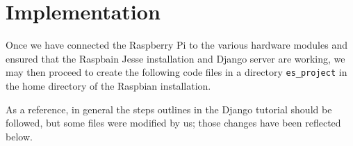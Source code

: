 \section{Implementation}

	Once we have connected the Raspberry Pi to the various hardware modules and ensured that the Raspbain Jesse installation and Django server are working, we may then proceed to create the following code files in a directory \texttt{es\_project} in the home directory of the Raspbian installation. 
	
	As a reference, in general the steps outlines in the Django tutorial \cite{DjangoTutorial} should be followed, but some files were modified by us; those changes have been reflected below.